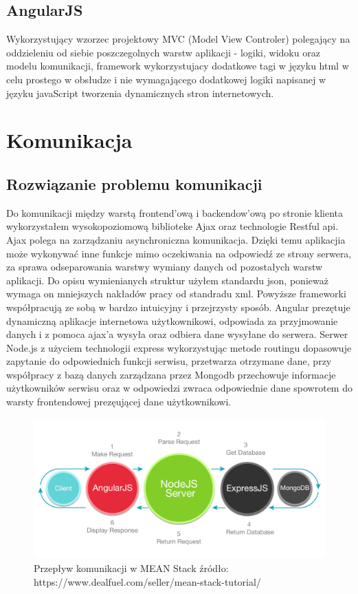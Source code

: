\documentclass[12pt]{report}
\begin{document}
\subsection{AngularJS}
Wykorzystujący wzorzec projektowy MVC (Model View Controler) polegający na oddzieleniu od siebie poszczegolnych warstw aplikacji - logiki, widoku oraz modelu komunikacji, framework wykorzystujacy dodatkowe tagi w języku html w celu prostego w obsłudze i nie wymagającego dodatkowej logiki napisanej w języku javaScript tworzenia dynamicznych stron internetowych.

\section{Komunikacja}

\subsection{Rozwiązanie problemu komunikacji}
Do komunikacji między warstą frontend'ową i backendow'ową po stronie klienta wykorzystałem wysokopoziomową biblioteke Ajax oraz technologie Restful api. 
Ajax polega na zarządzaniu asynchroniczna komunikacja. 
Dzięki temu aplikacjia może wykonywać inne funkcje mimo oczekiwania na odpowiedź ze strony serwera, za sprawa odseparowania warstwy wymiany danych od pozostałych warstw aplikacji.
Do opisu wymienianych struktur użyłem standardu json, ponieważ wymaga on mniejszych nakładów pracy od standradu xml. 
Powyższe frameworki współpracują ze sobą w bardzo intuicyjny i przejrzysty sposób. 
Angular prezętuje dynamiczną aplikacje internetowa użytkownikowi, odpowiada za przyjmowanie danych i z pomoca ajax'a wysyła oraz odbiera dane wysyłane do serwera. 
Serwer Node.js z użyciem technologii express wykorzystując metode routingu dopasowuje zapytanie do odpowiednich funkcji serwisu, przetwarza otrzymane dane, przy współpracy z bazą danych zarządzana przez Mongodb przechowuje informacje użytkowników serwisu oraz w odpowiedzi zwraca odpowiednie dane spowrotem do warsty frontendowej prezęującej dane użytkownikowi. 

\begin{figure}[!hb]
\centering
\includegraphics[width=\textwidth,height=\textheight,keepaspectratio]{Meanex.png}
\caption{Przepływ komunikacji w MEAN Stack źródło: https://www.dealfuel.com/seller/mean-stack-tutorial/}
\end{figure}
\end{document}
